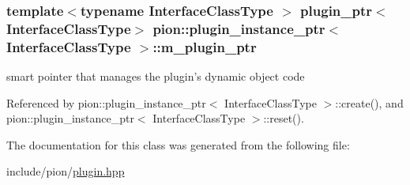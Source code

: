 \hypertarget{classpion_1_1plugin__instance__ptr_a65856c5fbd856e3c106e3ae708369109}{
\subsubsection[{m\-\_\-plugin\-\_\-ptr}]{\setlength{\rightskip}{0pt plus 5cm}template$<$typename Interface\-Class\-Type $>$ {\bf plugin\-\_\-ptr}$<$Interface\-Class\-Type$>$ {\bf pion\-::plugin\-\_\-instance\-\_\-ptr}$<$ Interface\-Class\-Type $>$\-::m\-\_\-plugin\-\_\-ptr\hspace{0.3cm}{\ttfamily [protected]}}}\label{classpion_1_1plugin__instance__ptr_a65856c5fbd856e3c106e3ae708369109}


smart pointer that manages the plugin's dynamic object code 



Referenced by pion\-::plugin\-\_\-instance\-\_\-ptr$<$ Interface\-Class\-Type $>$\-::create(), and pion\-::plugin\-\_\-instance\-\_\-ptr$<$ Interface\-Class\-Type $>$\-::reset().



The documentation for this class was generated from the following file\-:\begin{DoxyCompactItemize}
\item 
include/pion/\hyperlink{plugin_8hpp}{plugin.\-hpp}\end{DoxyCompactItemize}
